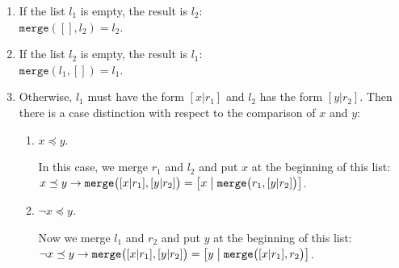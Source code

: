 \begin{enumerate}
\item If the list $l_1$ is empty, the result is $l_2$: \\[0.2cm]
      \hspace*{1.3cm} 
      $\mathtt{merge}([], l_2) = l_2$.
\item If the list $l_2$  is empty, the result is $l_1$: \\[0.2cm]
      \hspace*{1.3cm} 
      $\mathtt{merge}(l_1, []) = l_1$.
\item Otherwise, $l_1$ must have the form $[x|r_1]$ and $l_2$ has the form $[y|r_2]$.
      Then there is a case distinction with respect to the comparison of $x$ and $y$:
      \begin{enumerate}
      \item $x \preceq y$.

            In this case, we merge $r_1$ and $l_2$ and put $x$ at the beginning of this list:
            \\[0.2cm]
            \hspace*{1.3cm} 
            $x \preceq y \rightarrow \mathtt{merge}\bigl([x|r_1], [y|r_2]\bigr) = \bigl[x \bigm| \mathtt{merge}\bigl(r_1,[y|r_2]\bigr)\bigr]$.
      \item $\neg x \preceq y$.

            Now we merge $l_1$ and $r_2$ and put $y$ at the beginning of this list:
            \\[0.2cm]
            \hspace*{1.3cm} 
            $\neg x \preceq y \rightarrow \mathtt{merge}\bigl([x|r_1], [y|r_2]\bigr) = \bigl[y \bigm| \mathtt{merge}\bigl([x|r_1],r_2\bigr)\bigr]$.
      \end{enumerate}
\end{enumerate}

